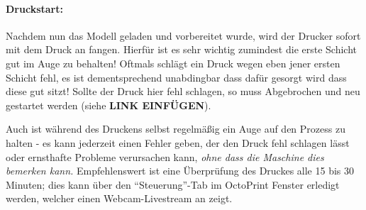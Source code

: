 \paragraph{Druckstart:} Nachdem nun das Modell geladen und vorbereitet wurde, wird der Drucker sofort mit dem Druck an fangen. Hierfür ist es sehr wichtig zumindest die erste Schicht gut im Auge zu behalten! Oftmals schlägt ein Druck wegen eben jener ersten Schicht fehl, es ist dementsprechend unabdingbar dass dafür gesorgt wird dass diese gut sitzt! Sollte der Druck hier fehl schlagen, so muss Abgebrochen und neu gestartet werden (siehe \textbf{LINK EINFÜGEN}). 

Auch ist während des Druckens selbst regelmäßig ein Auge auf den Prozess zu halten - es kann jederzeit einen Fehler geben, der den Druck fehl schlagen lässt oder ernsthafte Probleme verursachen kann, \emph{ohne dass die Maschine dies bemerken kann.} Empfehlenswert ist eine Überprüfung des Druckes alle 15 bis 30 Minuten; dies kann über den "`Steuerung"'-Tab im OctoPrint Fenster erledigt werden, welcher einen Webcam-Livestream an zeigt.